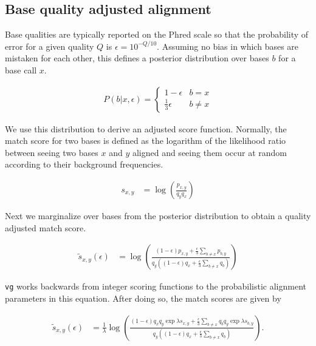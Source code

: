 
\subsection{Base quality adjusted alignment}

Base qualities are typically reported on the Phred scale so that the probability of error for a given quality $Q$ is $\epsilon = 10^{-Q/10}$. Assuming no bias in which bases are mistaken for each other, this defines a posterior distribution over bases $b$ for a base call $x$.

\begin{align}
    P(b|x, \epsilon) = \begin{cases}
        1 - \epsilon & b = x \\
        \frac{1}{3} \epsilon & b \neq x
    \end{cases}
\end{align}

We use this distribution to derive an adjusted score function. Normally, the match score for two bases is defined as the logarithm of the likelihood ratio between seeing two bases $x$ and $y$ aligned and seeing them occur at random according to their background frequencies. 

\begin{align}
    s_{x,y} &= \log\left(\frac{p_{x,y}}{q_y q_x} \right) \label{eqn:base_score}
\end{align}

Next we marginalize over bases from the posterior distribution to obtain a quality adjusted match score.

\begin{align}
    \tilde s_{x,y}(\epsilon) &= \log\left(\frac{(1 - \epsilon)p_{x,y} + \frac{\epsilon}{3}\sum_{b \neq x}p_{b, y}}{q_y\left((1 - \epsilon)q_x + \frac{\epsilon}{3}\sum_{b \neq x}q_b \right)} \right)
\end{align}

{\tt vg} works backwards from integer scoring functions to the probabilistic alignment parameters in this equation. After doing so, the match scores are given by

\begin{align}
    \tilde s_{x,y}(\epsilon) &= \frac{1}{\lambda} \log\left(\frac{(1 - \epsilon)q_x q_y \exp \lambda s_{x,y} + \frac{\epsilon}{3}\sum_{b \neq x}q_b q_y \exp \lambda s_{b,y}}{q_y\left((1 - \epsilon)q_x + \frac{\epsilon}{3}\sum_{b \neq x}q_b \right)} \right).
\end{align}

